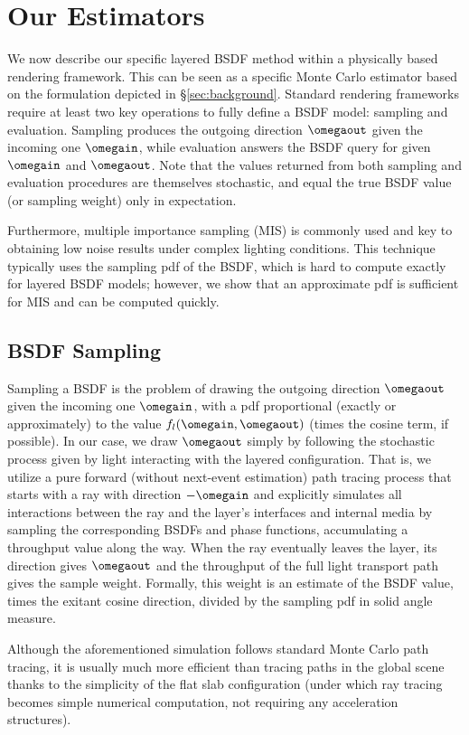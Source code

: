 \section{Our Estimators}
\label{sec:ours}
%
We now describe our specific layered BSDF method within a physically based rendering framework. This can be seen as a specific Monte Carlo estimator based on the formulation depicted in \S\ref{sec:background}. Standard rendering frameworks require at least two key operations to fully define a BSDF model: sampling and evaluation. Sampling produces the outgoing direction $\omegaout$ given the incoming one $\omegain$, while evaluation answers the BSDF query for given $\omegain$ and $\omegaout$. Note that the values returned from both sampling and evaluation procedures are themselves stochastic, and equal the true BSDF value (or sampling weight) only in expectation.

Furthermore, multiple importance sampling (MIS) is commonly used and key to obtaining low noise results under complex lighting conditions. This technique typically uses the sampling pdf of the BSDF, which is  hard to compute exactly for layered BSDF models; however, we show that an approximate pdf is sufficient for MIS and can be computed quickly.

\subsection{BSDF Sampling}
\label{subsec:ours_sample}
%
Sampling a BSDF is the problem of drawing the outgoing direction $\omegaout$ given the incoming one $\omegain$, with a pdf proportional (exactly or approximately) to the value $f_l(\omegain, \omegaout)$ (times the cosine term, if possible).
In our case, we draw $\omegaout$ simply by following the stochastic process given by light interacting with the layered configuration.
That is, we utilize a pure forward (without next-event estimation) path tracing process that starts with a ray with direction $-\omegain$ and explicitly simulates all interactions between the ray and the layer's interfaces and internal media by sampling the corresponding BSDFs and phase functions, accumulating a throughput value along the way.
When the ray eventually leaves the layer, its direction gives $\omegaout$ and the throughput of the full light transport path gives the sample weight. Formally, this weight is an estimate of the BSDF value, times the exitant cosine direction, divided by the sampling pdf in solid angle measure.

Although the aforementioned simulation follows standard Monte Carlo path tracing, it is usually much more efficient than tracing paths in the global scene thanks to the simplicity of the flat slab configuration (under which ray tracing becomes simple numerical computation, not requiring any acceleration structures).


